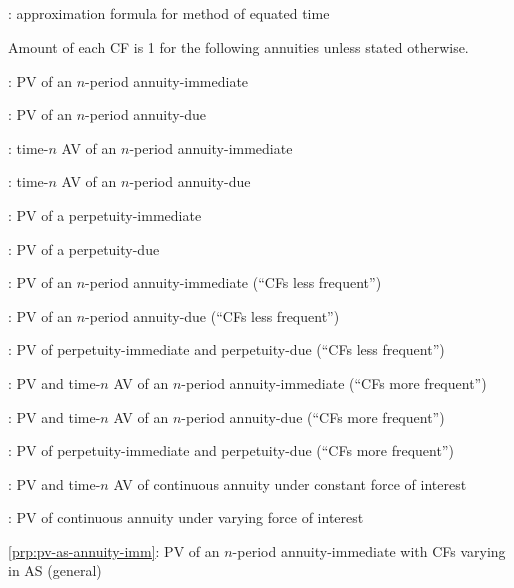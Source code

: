 \subsection*{}
\item {}: approximation formula for method of equated time
\begin{note}
Amount of each CF is 1 for the following annuities unless stated otherwise.
\end{note}
\item {}: PV of an \(n\)-period annuity-immediate
\item {}: PV of an \(n\)-period annuity-due
\item {}: time-\(n\) AV of an \(n\)-period annuity-immediate
\item {}: time-\(n\) AV of an \(n\)-period annuity-due
\item {}: PV of a perpetuity-immediate
\item {}: PV of a perpetuity-due
\item {}: PV of an \(n\)-period annuity-immediate (``CFs less frequent'')
\item {}: PV of an \(n\)-period annuity-due (``CFs less frequent'')
\item {}: PV of perpetuity-immediate and perpetuity-due (``CFs less frequent'')
\item {}: PV and time-\(n\) AV of an \(n\)-period annuity-immediate (``CFs more frequent'')
\item {}: PV and time-\(n\) AV of an \(n\)-period annuity-due (``CFs more frequent'')
\item {}: PV of perpetuity-immediate and perpetuity-due (``CFs more frequent'')
\item {}: PV and time-\(n\) AV of continuous annuity under constant force of interest
\item {}: PV of continuous annuity under varying force of interest
\item \cref{prp:pv-as-annuity-imm}: PV of an \(n\)-period annuity-immediate with CFs varying in AS (general)
